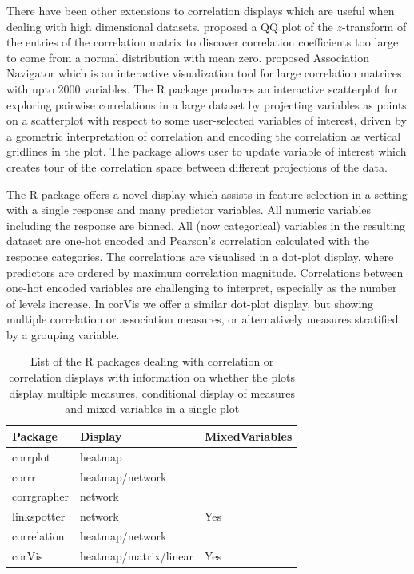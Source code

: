 There have been other extensions to correlation displays which are
useful when dealing with high dimensional datasets.
\citet{hills1969looking} proposed a QQ plot of the \(z\)-transform of
the entries of the correlation matrix to discover correlation
coefficients too large to come from a normal distribution with mean
zero. \citet{buja2016visualization} proposed Association Navigator which
is an interactive visualization tool for large correlation matrices with
upto 2000 variables. The R package  \citep{scorr}
produces an interactive scatterplot for exploring pairwise correlations
in a large dataset by projecting variables as points on a scatterplot
with respect to some user-selected variables of interest, driven by a
geometric interpretation of correlation and encoding the correlation as
vertical gridlines in the plot. The package allows user to update
variable of interest which creates tour of the correlation space between
different projections of the data.

The R package  offers a novel display which
assists in feature selection in a setting with a single response and
many predictor variables. All numeric variables including the response
are binned. All (now categorical) variables in the resulting dataset are
one-hot encoded and Pearson's correlation calculated with the response
categories. The correlations are visualised in a dot-plot display, where
predictors are ordered by maximum correlation magnitude. Correlations
between one-hot encoded variables are challenging to interpret,
especially as the number of levels increase. In corVis we offer a
similar dot-plot display, but showing multiple correlation or
association measures, or alternatively measures stratified by a grouping
variable.

\begin{Schunk}
\begin{table}

\caption{\label{tab:corrdisplay-packages}List of the R packages dealing with correlation or correlation displays with information on whether the plots display multiple measures, conditional display of measures and mixed variables in a single plot}
\centering
\begin{tabular}[t]{lll}
\toprule
Package & Display & MixedVariables\\
\midrule
corrplot & heatmap & \\
corrr & heatmap/network & \\
corrgrapher & network & \\
linkspotter & network & Yes\\
correlation & heatmap/network & \\
\addlinespace
corVis & heatmap/matrix/linear & Yes\\
\bottomrule
\end{tabular}
\end{table}

\end{Schunk}

